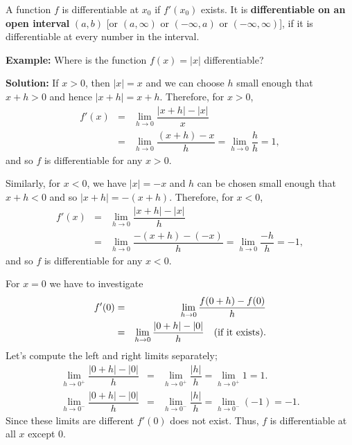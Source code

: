 \documentclass[titlepage,a4paper,12pt]{report}
\begin{document}
\noindent  A function $f$ is differentiable at $x_0$ if $f'(x_0)$ exists. It is \textbf{differentiable on an open interval} $(a,b)$ [or $(a,\infty)$ or $(-\infty , a)$ or $(-\infty , \infty)$], if it is differentiable at every number in the interval.

\noindent \textbf{Example:} Where is the function $f(x)=|x|$ differentiable?

\noindent \textbf{Solution:} If $x>0$, then $|x|=x$ and we can choose $h$ small enough that $x+h>0$ and hence $|x+h|=x+h$. Therefore, for $x>0$, 
\begin{eqnarray*}
f'(x) &=& \lim _{h\rightarrow 0}\dfrac{|x+h|-|x|}{x}\\
&=&\lim _{h\rightarrow 0} \dfrac{(x+h)-x}{h}=\lim _{h\rightarrow 0}\dfrac{h}{h}=1,
\end{eqnarray*}
and so $f$ is differentiable for any $x>0$. 

\noindent Similarly, for $x<0$, we have $|x|=-x$ and $h$ can be chosen small enough that $x+h<0$ and so $|x+h|=-(x+h)$. Therefore, for $x<0$, 
\begin{eqnarray*}
f'(x) &=& \lim _{h\rightarrow 0}\dfrac{|x+h|-|x|}{h}\\
&=& \lim _{h\rightarrow 0}\dfrac{-(x+h)-(-x)}{h} =\lim _{h\rightarrow 0} \dfrac{-h}{h}=-1,
\end{eqnarray*} 
and so $f$ is differentiable for any $x<0$. 

\noindent For $x=0$ we have to investigate 
\begin{eqnarray*}
f'(0) &=& \lim _{h\rightarrow 0}\dfrac{f(0+h)-f(0)}{h}\\
&=& \lim _{h\rightarrow 0} \dfrac{|0+h|-|0|}{h} \quad (\hbox{if it exists}). 
\end{eqnarray*}
Let's compute the left and right limits separately;
\begin{eqnarray*}
\lim _{h\rightarrow 0^+} \dfrac{|0+h|-|0|}{h} &=& \lim _{h\rightarrow 0^+}\dfrac{|h|}{h}=\lim _{h\rightarrow 0^+} 1=1.\\
\lim _{h\rightarrow 0^-} \dfrac{|0+h|-|0|}{h} &=& \lim _{h\rightarrow 0^-}\dfrac{|h|}{h}=\lim _{h\rightarrow 0^-} (-1)=-1.
\end{eqnarray*}
Since these limits are different $f'(0)$ does not exist.  Thus, $f$ is differentiable at all $x$ except $0$.
\end{document}
